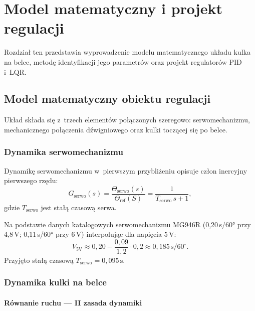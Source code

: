 
\chapter{Model matematyczny i projekt regulacji}
\label{ch:model}

Rozdział ten przedstawia wyprowadzenie modelu matematycznego układu kulka na belce,
metodę identyfikacji jego parametrów oraz projekt regulatorów PID i~LQR.

\section{Model matematyczny obiektu regulacji}

Układ składa się z~trzech elementów połączonych szeregowo: serwomechanizmu,
mechanicznego połączenia dźwigniowego oraz kulki toczącej się po belce.

\subsection{Dynamika serwomechanizmu}

Dynamikę serwomechanizmu w~pierwszym przybliżeniu opisuje człon inercyjny
pierwszego rzędu:
\begin{equation}
  G_{\mathrm{serwo}}(s) = \frac{\Theta_{\mathrm{serwo}}(s)}{\Theta_{\mathrm{ref}}(S)} = \frac{1}{T_{\mathrm{serwo}}\,s+1},
\end{equation}
gdzie $T_{\mathrm{serwo}}$ jest stałą czasową serwa.

Na podstawie danych katalogowych serwomechanizmu MG946R
(0{,}20\,s/60° przy 4{,}8\,V; 0{,}11\,s/60° przy 6\,V)
interpolując dla napięcia 5\,V:
\begin{equation}
  V_{5\mathrm{V}} \approx 0{,}20 - \frac{0{,}09}{1{,}2} \cdot 0{,}2 \approx 0{,}185\,\mathrm{s}/60^{\circ}.
\end{equation}
Przyjęto stałą czasową $T_{\mathrm{serwo}} = 0{,}095\,\mathrm{s}$.

\subsection{Dynamika kulki na belce}

\subsubsection{Równanie ruchu — II zasada dynamiki}

